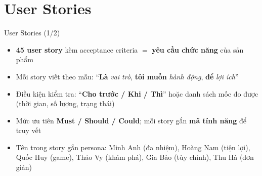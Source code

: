 \documentclass[aspectratio=169]{beamer}
\begin{document}
\section{User Stories}
\begin{frame}{User Stories (1/2)}
  \begin{itemize}
    \item \textbf{45 user story} kèm acceptance criteria $=$ \textbf{yêu cầu chức năng} của sản phẩm
    \item Mỗi story viết theo mẫu: ``\textbf{Là} \textit{vai trò}, \textbf{tôi muốn} \textit{hành động}, \textbf{để} \textit{lợi ích}''
    \item Điều kiện kiểm tra: ``\textbf{Cho trước / Khi / Thì}'' hoặc danh sách mốc đo được (thời gian, số lượng, trạng thái)
    \item Mức ưu tiên \textbf{Must / Should / Could}; mỗi story gắn \textbf{mã tính năng} để truy vết
    \item Tên trong story gắn persona: Minh Anh (đa nhiệm), Hoàng Nam (tiện lợi), Quốc Huy (game), Thảo Vy (khám phá), Gia Bảo (tùy chỉnh), Thu Hà (đơn giản)
  \end{itemize}
\end{frame}
\end{document}

